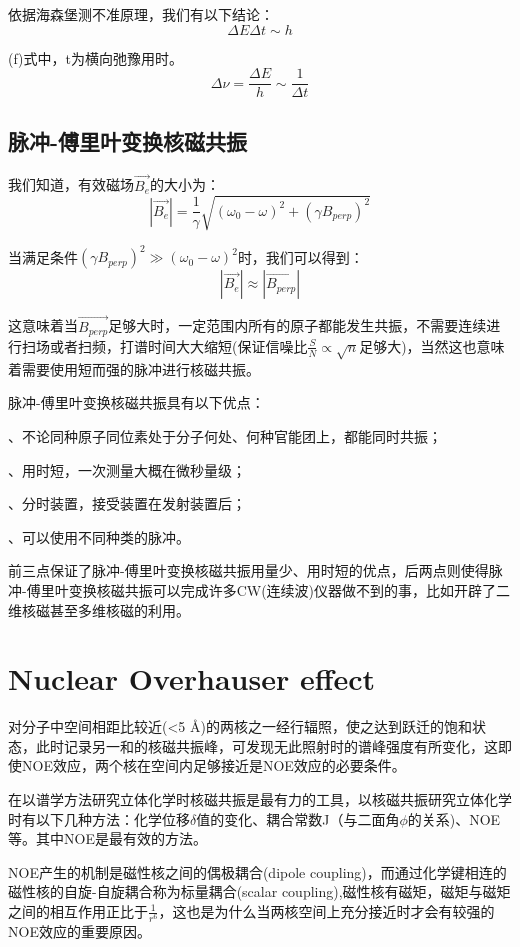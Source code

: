 依据海森堡测不准原理，我们有以下结论：
\[\Delta E \Delta t \sim h \tag{f}\]

(f)式中，t为横向弛豫用时。
\[\Delta \nu = \frac{\Delta E}{h} \sim \frac{1}{\Delta t} \tag{g}\]

\subsection{脉冲-傅里叶变换核磁共振}

我们知道，有效磁场$\overrightarrow{B_e}$的大小为：
\[|\overrightarrow{B_e}|=\frac{1}{\gamma}\sqrt{(\omega_0-\omega)^2+(\gamma B_{perp})^2}\]

当满足条件$(\gamma B_{perp})^2 \gg (\omega_0-\omega)^2$时，我们可以得到：
\[|\overrightarrow{B_e}| \approx |\overrightarrow{B_{perp}}|\]

这意味着当$\overrightarrow{B_{perp}}$足够大时，一定范围内所有的原子都能发生共振，不需要连续进行扫场或者扫频，打谱时间大大缩短(保证信噪比$\frac{S}{N} \propto \sqrt{n}$足够大)，当然这也意味着需要使用短而强的脉冲进行核磁共振。

脉冲-傅里叶变换核磁共振具有以下优点：

、不论同种原子同位素处于分子何处、何种官能团上，都能同时共振；

、用时短，一次测量大概在微秒量级；

、分时装置，接受装置在发射装置后；

、可以使用不同种类的脉冲。

前三点保证了脉冲-傅里叶变换核磁共振用量少、用时短的优点，后两点则使得脉冲-傅里叶变换核磁共振可以完成许多CW(连续波)仪器做不到的事，比如开辟了二维核磁甚至多维核磁的利用。

\section{Nuclear Overhauser effect}

对分子中空间相距比较近(<5 \AA)的两核之一经行辐照，使之达到跃迁的饱和状态，此时记录另一和的核磁共振峰，可发现无此照射时的谱峰强度有所变化，这即使NOE效应，两个核在空间内足够接近是NOE效应的必要条件。

在以谱学方法研究立体化学时核磁共振是最有力的工具，以核磁共振研究立体化学时有以下几种方法：化学位移$\delta$值的变化、耦合常数J（与二面角$\phi$的关系)、NOE等。其中NOE是最有效的方法。

NOE产生的机制是磁性核之间的偶极耦合(dipole coupling)，而通过化学键相连的磁性核的自旋-自旋耦合称为标量耦合(scalar coupling),磁性核有磁矩，磁矩与磁矩之间的相互作用正比于$\frac{1}{r^6}$，这也是为什么当两核空间上充分接近时才会有较强的NOE效应的重要原因。

